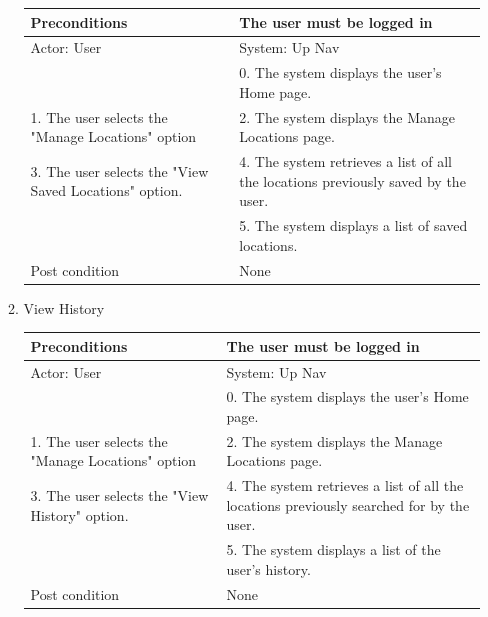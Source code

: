 \documentclass{article}
\begin{document}
\begin{center}
\begin{enumerate}
\begin{enumerate}
	\begin{table}[]
	\centering
		\begin{tabular}{ | m{15em} | m{15em}| }
		\hline
		Preconditions                                          										& The user must be logged in \\ 
		\hline
		Actor: User                                            										& System: Up Nav \\
		\hline
                                                       												& 0. The system displays the user's Home page. \\ 
		\hline
		1. The user selects the "Manage Locations" option								& 2. The system displays the Manage Locations page. \\
		\hline
		3. The user selects the "View Saved Locations" option.							& 4. The system retrieves a list of all the locations previously saved by the user. \\ 
		\hline
                                                      												& 5. The system displays a list of saved locations. \\
		\hline
		Post condition                                         		 								& None                                                                              \\
		\hline
		\end{tabular}
	\end{table}

	\item{View History}

	\begin{table}[]
	\centering
		\begin{tabular}{ | m{15em} | m{15em}| }
		\hline
		Preconditions                                   										& The user must be logged in \\ 
		\hline
		Actor: User                                    										& System: Up Nav \\ 
		\hline
                                               													& 0. The system displays the user's Home page. \\ 
		\hline
		1. The user selects the "Manage Locations" option								& 2. The system displays the Manage Locations page. \\
		\hline
		3. The user selects the "View History" option. 									& 4. The system retrieves a list of all the locations previously searched for by the user. \\ 
		\hline
                                               													& 5. The system displays a list of the user's history. \\
		 \hline
		Post condition                                 										& None \\ 
		\hline
		\end{tabular}
	\end{table}


\end{enumerate}
\end{enumerate}
\end{center}
\end{document}
